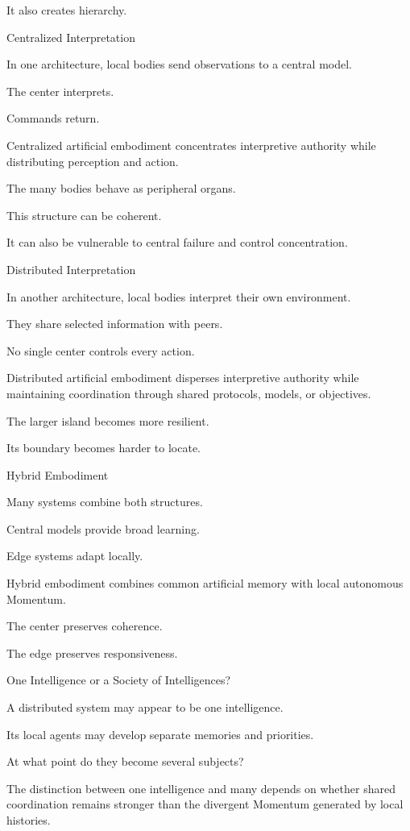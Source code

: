 It also creates hierarchy.

Centralized Interpretation

In one architecture, local bodies send observations to a central model.

The center interprets.

Commands return.

Centralized artificial embodiment concentrates interpretive authority while distributing perception and action.

The many bodies behave as peripheral organs.

This structure can be coherent.

It can also be vulnerable to central failure and control concentration.

Distributed Interpretation

In another architecture, local bodies interpret their own environment.

They share selected information with peers.

No single center controls every action.

Distributed artificial embodiment disperses interpretive authority while maintaining coordination through shared protocols, models, or objectives.

The larger island becomes more resilient.

Its boundary becomes harder to locate.

Hybrid Embodiment

Many systems combine both structures.

Central models provide broad learning.

Edge systems adapt locally.

Hybrid embodiment combines common artificial memory with local autonomous Momentum.

The center preserves coherence.

The edge preserves responsiveness.

One Intelligence or a Society of Intelligences?

A distributed system may appear to be one intelligence.

Its local agents may develop separate memories and priorities.

At what point do they become several subjects?

The distinction between one intelligence and many depends on whether shared coordination remains stronger than the divergent Momentum generated by local histories.

